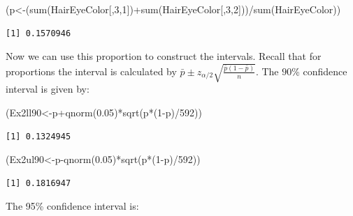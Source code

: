 \documentclass[
  letterpaper,
  DIV=11,
  numbers=noendperiod]{scrreprt}
\newenvironment{Shaded}{\begin{snugshade}}{\end{snugshade}}
\newcommand{\DecValTok}[1]{\textcolor[rgb]{0.68,0.00,0.00}{#1}}
\newcommand{\FloatTok}[1]{\textcolor[rgb]{0.68,0.00,0.00}{#1}}
\newcommand{\FunctionTok}[1]{\textcolor[rgb]{0.28,0.35,0.67}{#1}}
\newcommand{\NormalTok}[1]{\textcolor[rgb]{0.00,0.23,0.31}{#1}}
\newcommand{\OtherTok}[1]{\textcolor[rgb]{0.00,0.23,0.31}{#1}}
\newcommand{\SpecialCharTok}[1]{\textcolor[rgb]{0.37,0.37,0.37}{#1}}
\begin{document}
\begin{Shaded}
\begin{Highlighting}[numbers=left,,]
\NormalTok{(p}\OtherTok{\textless{}{-}}\NormalTok{(}\FunctionTok{sum}\NormalTok{(HairEyeColor[,}\DecValTok{3}\NormalTok{,}\DecValTok{1}\NormalTok{])}\SpecialCharTok{+}\FunctionTok{sum}\NormalTok{(HairEyeColor[,}\DecValTok{3}\NormalTok{,}\DecValTok{2}\NormalTok{]))}\SpecialCharTok{/}\FunctionTok{sum}\NormalTok{(HairEyeColor))}
\end{Highlighting}
\end{Shaded}

\begin{verbatim}
[1] 0.1570946
\end{verbatim}

Now we can use this proportion to construct the intervals. Recall that
for proportions the interval is calculated by
\(\bar{p} \pm z_{\alpha/2} \sqrt{\frac{\bar{p}(1-\bar{p})}{n}}\). The
\(90\)\% confidence interval is given by:

\begin{Shaded}
\begin{Highlighting}[numbers=left,,]
\NormalTok{(Ex2ll90}\OtherTok{\textless{}{-}}\NormalTok{p}\SpecialCharTok{+}\FunctionTok{qnorm}\NormalTok{(}\FloatTok{0.05}\NormalTok{)}\SpecialCharTok{*}\FunctionTok{sqrt}\NormalTok{(p}\SpecialCharTok{*}\NormalTok{(}\DecValTok{1}\SpecialCharTok{{-}}\NormalTok{p)}\SpecialCharTok{/}\DecValTok{592}\NormalTok{))}
\end{Highlighting}
\end{Shaded}

\begin{verbatim}
[1] 0.1324945
\end{verbatim}

\begin{Shaded}
\begin{Highlighting}[numbers=left,,]
\NormalTok{(Ex2ul90}\OtherTok{\textless{}{-}}\NormalTok{p}\SpecialCharTok{{-}}\FunctionTok{qnorm}\NormalTok{(}\FloatTok{0.05}\NormalTok{)}\SpecialCharTok{*}\FunctionTok{sqrt}\NormalTok{(p}\SpecialCharTok{*}\NormalTok{(}\DecValTok{1}\SpecialCharTok{{-}}\NormalTok{p)}\SpecialCharTok{/}\DecValTok{592}\NormalTok{))}
\end{Highlighting}
\end{Shaded}

\begin{verbatim}
[1] 0.1816947
\end{verbatim}

The 95\% confidence interval is:
\end{document}
